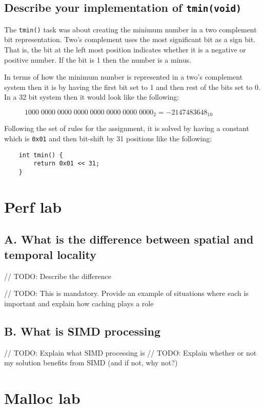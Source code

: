\documentclass[11pt]{article}
\newcommand{\code}[1]{{\colorbox{lightgray!15}{\color{orange}\texttt{#1}}}}
\begin{document}
\subsection{Describe your implementation of \code{tmin(void)}}
The \code{tmin()} task was about creating the minimum number in a two complement bit representation.
Two's complement uses the most significant bit as a sign bit. That is, the bit at the left most position indicates whether 
it is a negative or positive number. If the bit is 1 then the number is a minus. 

In terms of how the minimum number is represented in a two's complement system then it is by having the first bit set to 1 and then rest of the bits set to 0.
In a 32 bit system then it would look like the following:

\begin{figure}[h]
    $1000 \; 0000 \; 0000 \; 0000 \; 0000 \; 0000 \; 0000 \; 0000_2 = -2147483648_{10}$
    \centering
\end{figure}


Following the set of rules for the assignment, it is solved by having a constant which is \code{0x01}
and then bit-shift by 31 positions like the following:
\begin{lstlisting}
    int tmin() {
        return 0x01 << 31;
    }
\end{lstlisting}


\section{Perf lab}

\subsection{A. What is the difference between spatial and temporal locality}

// TODO: Describe the difference

// TODO: This is mandatory. Provide an example of situations where each is important and explain how caching plays a role

\subsection{B. What is SIMD processing}

// TODO: Explain what SIMD processing is
// TODO: Explain whether or not my solution benefits from SIMD (and if not, why not?)
\section{Malloc lab}
\end{document}
